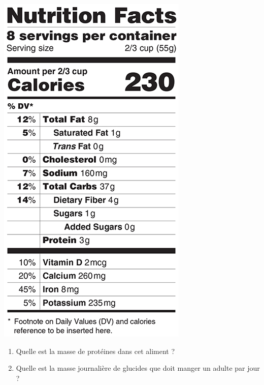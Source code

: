 
\begin{center}
\includegraphics[scale=0.8]{Prop-34.jpg} 
\end{center}

\begin{enumerate}
\item Quelle est la masse de protéines dans cet aliment ?
\item Quelle est la masse journalière de glucides que doit manger un adulte par jour ?
\end{enumerate}



